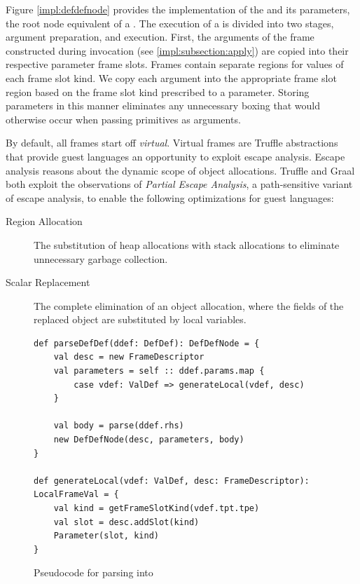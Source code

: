 Figure \ref{impl:defdefnode} provides the implementation of the  and its parameters, the root node equivalent of a .
The execution of a  is divided into two stages, argument preparation, and execution.
First, the arguments of the frame constructed during invocation (see \ref{impl:subsection:apply}) are copied into their respective parameter frame slots.
Frames contain separate regions for values of each frame slot kind.
We copy each argument into the appropriate frame slot region based on the frame slot kind prescribed to a parameter.
Storing parameters in this manner eliminates any unnecessary boxing that would otherwise occur when passing primitives as arguments.

By default, all frames start off \textit{virtual}.
Virtual frames are Truffle abstractions that provide guest languages an opportunity to exploit escape analysis.
Escape analysis\cite{escape-analysis} reasons about the dynamic scope of object allocations. 
Truffle and Graal both exploit the observations of \textit{Partial Escape Analysis}\cite{java:partial-escape-analysis}, a path-sensitive variant of escape analysis, to enable the following optimizations for guest languages:

\begin{description}
	\item[Region Allocation\cite{java:escape-analysis,tofte:region-memory}] The substitution of heap allocations with stack allocations to eliminate unnecessary garbage collection.
	\item[Scalar Replacement\cite{java:escape-analysis-optimizations}] The complete elimination of an object allocation, where the fields of the replaced object are substituted by local variables.
\end{description}

\begin{figure}[!htb]
\begin{verbatim}
def parseDefDef(ddef: DefDef): DefDefNode = {
	val desc = new FrameDescriptor
	val parameters = self :: ddef.params.map {
		case vdef: ValDef => generateLocal(vdef, desc)
	}
		
	val body = parse(ddef.rhs)
	new DefDefNode(desc, parameters, body)
}
	
def generateLocal(vdef: ValDef, desc: FrameDescriptor): LocalFrameVal = {
	val kind = getFrameSlotKind(vdef.tpt.tpe)
	val slot = desc.addSlot(kind)
	Parameter(slot, kind)
}
\end{verbatim}
\caption{Pseudocode for parsing  into }
\label{impl:parse-defdef}
\end{figure}

